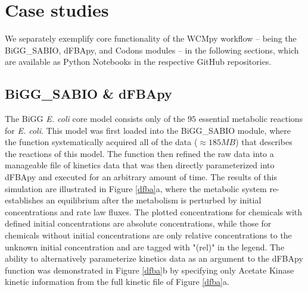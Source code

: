 \section{Case studies}
We separately exemplify core functionality of the WCMpy workflow -- being the BiGG\_SABIO, dFBApy, and Codons modules -- in the following sections, which are available as Python Notebooks in the respective GitHub repositories.

\subsection{BiGG\_SABIO \& dFBApy}
The BiGG \textit{E. coli} core model consists only of the $95$ essential metabolic reactions for \textit{E. coli}. This model was first loaded into the BiGG\_SABIO module, where the  function systematically acquired all of the data ($\approx 185 MB$) that describes the reactions of this model. The  function then refined the raw data into a manageable file of kinetics data that was then directly parameterized into dFBApy and executed for an arbitrary amount of time. The results of this simulation are illustrated in Figure \ref{dfba}a, where the metabolic system re-establishes an equilibrium after the metabolism is perturbed by initial concentrations and rate law fluxes. The plotted concentrations for chemicals with defined initial concentrations are absolute concentrations, while those for chemicals without initial concentrations are only relative concentrations to the unknown initial concentration and are tagged with "(rel)" in the legend. The ability to alternatively parameterize kinetics data as an argument to the  dFBApy function was demonstrated in Figure \ref{dfba}b by specifying only Acetate Kinase kinetic information from the full kinetic file of Figure \ref{dfba}a. 

